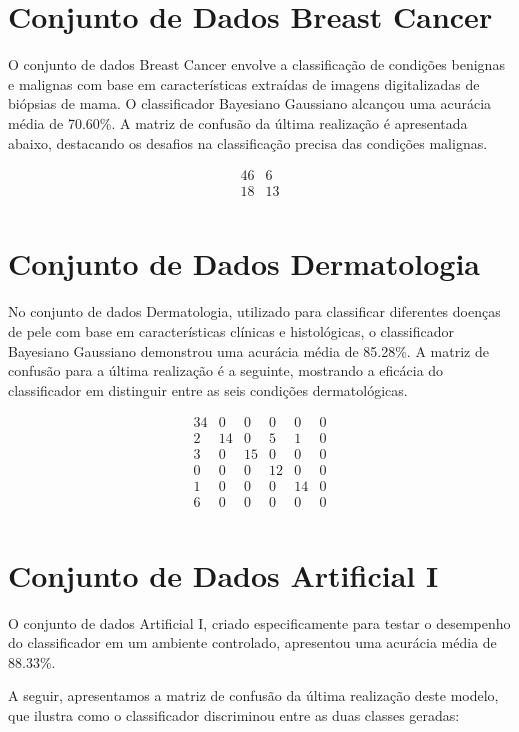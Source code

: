 \documentclass[12pt, a4paper]{report}
\begin{document}
\section{Conjunto de Dados Breast Cancer}

O conjunto de dados Breast Cancer envolve a classificação de condições benignas e malignas com base em características extraídas de imagens digitalizadas de biópsias de mama. O classificador Bayesiano Gaussiano alcançou uma acurácia média de 70.60\%. A matriz de confusão da última realização é apresentada abaixo, destacando os desafios na classificação precisa das condições malignas.

\[
\begin{array}{cc}
46 & 6 \\
18 & 13 \\
\end{array}
\]

\section{Conjunto de Dados Dermatologia}

No conjunto de dados Dermatologia, utilizado para classificar diferentes doenças de pele com base em características clínicas e histológicas, o classificador Bayesiano Gaussiano demonstrou uma acurácia média de 85.28\%. A matriz de confusão para a última realização é a seguinte, mostrando a eficácia do classificador em distinguir entre as seis condições dermatológicas.

\[
\begin{array}{cccccc}
34 & 0 & 0 & 0 & 0 & 0 \\
2 & 14 & 0 & 5 & 1 & 0 \\
3 & 0 & 15 & 0 & 0 & 0 \\
0 & 0 & 0 & 12 & 0 & 0 \\
1 & 0 & 0 & 0 & 14 & 0 \\
6 & 0 & 0 & 0 & 0 & 0 \\
\end{array}
\]

\section{Conjunto de Dados Artificial I}

O conjunto de dados Artificial I, criado especificamente para testar o desempenho do classificador em um ambiente controlado, apresentou uma acurácia média de 88.33\%.

A seguir, apresentamos a matriz de confusão da última realização deste modelo, que ilustra como o classificador discriminou entre as duas classes geradas:
\end{document}

